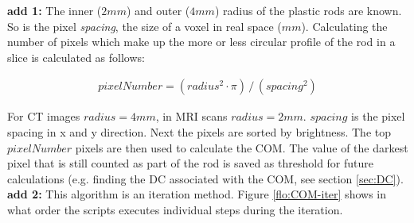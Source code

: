 \textbf{add 1:}
The inner ($2mm$) and outer ($4mm$) radius of the plastic rods are known.
So is the pixel \textit{spacing}, the size of a voxel in real space ($mm$).
Calculating the number of pixels which make up the more or less circular profile of the rod in a slice is calculated as follows:

\begin{align}
 pixelNumber = (radius^2 \cdot \pi) \, / \, (spacing^2)
\end{align}

For CT images $radius = 4mm$, in MRI scans $radius = 2mm$. $spacing$ is the pixel spacing in x and y direction.
Next the pixels are sorted by brightness. The top $pixelNumber$ pixels are then used to calculate the COM.
The value of the darkest pixel that is still counted as part of the rod is saved as threshold for future calculations (e.g. finding the DC associated with the COM, see section \ref{sec:DC}).
\textbf{add 2:}
This algorithm is an iteration method.
Figure \ref{flo:COM-iter} shows in what order the scripts executes individual steps during the iteration.


